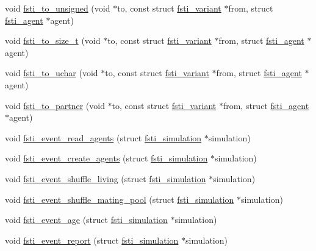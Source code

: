 \begin{DoxyCompactItemize}
\item 
void \mbox{\hyperlink{fsti-events_8c_a0dea3a294caae9f80119ec53f4116f0f}{fsti\+\_\+to\+\_\+unsigned}} (void $\ast$to, const struct \mbox{\hyperlink{structfsti__variant}{fsti\+\_\+variant}} $\ast$from, struct \mbox{\hyperlink{structfsti__agent}{fsti\+\_\+agent}} $\ast$agent)
\item 
void \mbox{\hyperlink{fsti-events_8c_ace7211e8e83bb5273066bc5fe50585a6}{fsti\+\_\+to\+\_\+size\+\_\+t}} (void $\ast$to, const struct \mbox{\hyperlink{structfsti__variant}{fsti\+\_\+variant}} $\ast$from, struct \mbox{\hyperlink{structfsti__agent}{fsti\+\_\+agent}} $\ast$agent)
\item 
void \mbox{\hyperlink{fsti-events_8c_aad3a0605b88803863e016f9409df45ba}{fsti\+\_\+to\+\_\+uchar}} (void $\ast$to, const struct \mbox{\hyperlink{structfsti__variant}{fsti\+\_\+variant}} $\ast$from, struct \mbox{\hyperlink{structfsti__agent}{fsti\+\_\+agent}} $\ast$agent)
\item 
void \mbox{\hyperlink{fsti-events_8c_aad5bd92a57743b08d6c9eb5bac33c78b}{fsti\+\_\+to\+\_\+partner}} (void $\ast$to, const struct \mbox{\hyperlink{structfsti__variant}{fsti\+\_\+variant}} $\ast$from, struct \mbox{\hyperlink{structfsti__agent}{fsti\+\_\+agent}} $\ast$agent)
\item 
void \mbox{\hyperlink{fsti-events_8c_ad8de30dd9c073568ba37e05c7500cb60}{fsti\+\_\+event\+\_\+read\+\_\+agents}} (struct \mbox{\hyperlink{structfsti__simulation}{fsti\+\_\+simulation}} $\ast$simulation)
\item 
void \mbox{\hyperlink{fsti-events_8c_a030bb87f8eda0fe6b1ef2ed7be908e60}{fsti\+\_\+event\+\_\+create\+\_\+agents}} (struct \mbox{\hyperlink{structfsti__simulation}{fsti\+\_\+simulation}} $\ast$simulation)
\item 
void \mbox{\hyperlink{fsti-events_8c_a2189b9c6c5bd7d490a1171b1bee5d4bf}{fsti\+\_\+event\+\_\+shuffle\+\_\+living}} (struct \mbox{\hyperlink{structfsti__simulation}{fsti\+\_\+simulation}} $\ast$simulation)
\item 
void \mbox{\hyperlink{fsti-events_8c_a342012337c20365982db5288d16ad05d}{fsti\+\_\+event\+\_\+shuffle\+\_\+mating\+\_\+pool}} (struct \mbox{\hyperlink{structfsti__simulation}{fsti\+\_\+simulation}} $\ast$simulation)
\item 
void \mbox{\hyperlink{fsti-events_8c_a37075282270dcb4f507a3cf7a302dc21}{fsti\+\_\+event\+\_\+age}} (struct \mbox{\hyperlink{structfsti__simulation}{fsti\+\_\+simulation}} $\ast$simulation)
\item 
void \mbox{\hyperlink{fsti-events_8c_a7e3b0a5901eb7df429eb2cf112dae628}{fsti\+\_\+event\+\_\+report}} (struct \mbox{\hyperlink{structfsti__simulation}{fsti\+\_\+simulation}} $\ast$simulation)

\end{DoxyCompactItemize}
